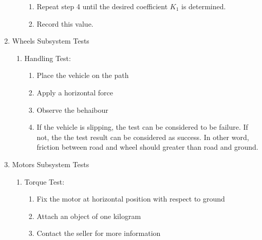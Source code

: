 \documentclass[a4paper,12pt]{article}
\begin{document}
\begin{enumerate}
\begin{enumerate}
\begin{enumerate}
\item Repeat step 4 until the desired coefficient $K_1$ is determined.

\item Record this value.

\end{enumerate}



\end{enumerate}







\item Wheels Subsystem Tests


\begin{enumerate}

\item {Handling Test:} 

\begin{enumerate}

\item  Place the vehicle on the path

\item Apply a horizontal force

\item Observe the behaibour 

\item If the vehicle is slipping, the test can be considered to be failure. If not, the the test result can be considered as success. In other word, friction between road and wheel should greater than road and ground. 


\end{enumerate}

\end{enumerate}


\item Motors Subsystem Tests


\begin{enumerate}

\item {Torque Test:} 

\begin{enumerate}

\item Fix the motor at horizontal position with respect to ground  

\item Attach an object of one kilogram  

\item Contact the seller for more information 


\end{enumerate}
\end{enumerate}
\end{enumerate}
\end{document}
